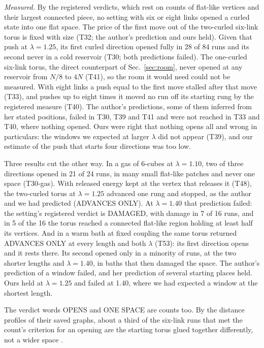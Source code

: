 \documentclass[aps,pre,10pt,twocolumn,superscriptaddress,nofootinbib]{revtex4-2}
\begin{document}
\emph{Measured.} By the registered verdicts, which rest on counts of flat-like vertices and their largest
connected piece, no setting with six or eight links opened a curled state into one flat space. The price of the
first move out of the two-curled six-link torus is fixed with size (T32; the
author's prediction and ours held). Given that push at $\lambda=1.25$, its first curled direction opened fully
in 28 of 84 runs and its second never in a cold reservoir (T30; both predictions failed). The one-curled six-link torus, the direct counterpart of
Sec.~\ref{sec:room}, never opened at any reservoir from $N/8$ to $4N$ (T41), so the room it would need could not
be measured. With eight links a push equal to the first move stalled after that move (T33), and pushes up to
eight times it moved no run off its starting rung by the registered measure (T40). The author's predictions,
some of them inferred from her stated positions, failed in T30, T39 and T41 and were not reached in T33 and T40,
where nothing opened. Ours were right that nothing opens all and wrong in particulars: the windows we expected
at larger $\lambda$ did not appear (T39), and our estimate of the push that starts four directions was too low.

Three results cut the other way. In a gas of 6-cubes at $\lambda=1.10$, two of
three directions opened in 21 of 24 runs, in many small flat-like patches and never one space (T30-gas). With
released energy kept at the vertex that releases it (T48), the two-curled torus at $\lambda=1.25$ advanced one
rung and stopped, as the author and we had predicted (ADVANCES ONLY). At $\lambda=1.40$ that prediction failed:
the setting's registered verdict is DAMAGED, with damage in 7 of 16 runs, and in 5 of the 16 the torus reached a
connected flat-like region holding at least half its vertices. And in a warm bath at fixed coupling the same torus returned ADVANCES ONLY at every length and both $\lambda$ (T53): its
first direction opens and it rests there. Its second opened only in a minority of runs, at the two shorter lengths and
$\lambda=1.40$, in baths that then damaged the space. The author's prediction of a window failed, and her
prediction of several starting places held. Ours held at $\lambda=1.25$ and failed at 1.40, where we had
expected a window at the shortest length.

The verdict words OPENS and ONE SPACE are counts too. By the distance profiles of their saved graphs, about a
third of the six-link runs that met the count's criterion for an opening are the starting torus glued together
differently, not a wider space \cite{paper5}.
\end{document}
